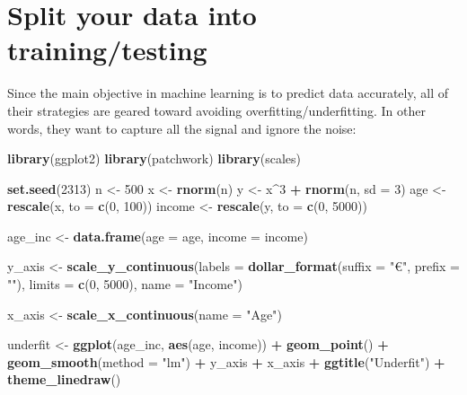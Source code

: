\documentclass[
]{book}
\newenvironment{Shaded}{\begin{snugshade}}{\end{snugshade}}
\newcommand{\DataTypeTok}[1]{\textcolor[rgb]{0.13,0.29,0.53}{#1}}
\newcommand{\DecValTok}[1]{\textcolor[rgb]{0.00,0.00,0.81}{#1}}
\newcommand{\KeywordTok}[1]{\textcolor[rgb]{0.13,0.29,0.53}{\textbf{#1}}}
\newcommand{\NormalTok}[1]{#1}
\newcommand{\OperatorTok}[1]{\textcolor[rgb]{0.81,0.36,0.00}{\textbf{#1}}}
\newcommand{\StringTok}[1]{\textcolor[rgb]{0.31,0.60,0.02}{#1}}
\begin{document}
\hypertarget{split-your-data-into-trainingtesting}{%
\section{Split your data into training/testing}\label{split-your-data-into-trainingtesting}}

Since the main objective in machine learning is to predict data accurately, all of their strategies are geared toward avoiding overfitting/underfitting. In other words, they want to capture all the signal and ignore the noise:

\begin{Shaded}
\begin{Highlighting}[]
\KeywordTok{library}\NormalTok{(ggplot2)}
\KeywordTok{library}\NormalTok{(patchwork)}
\KeywordTok{library}\NormalTok{(scales)}

\KeywordTok{set.seed}\NormalTok{(}\DecValTok{2313}\NormalTok{)}
\NormalTok{n <-}\StringTok{ }\DecValTok{500}
\NormalTok{x <-}\StringTok{ }\KeywordTok{rnorm}\NormalTok{(n)}
\NormalTok{y <-}\StringTok{ }\NormalTok{x}\OperatorTok{^}\DecValTok{3} \OperatorTok{+}\StringTok{ }\KeywordTok{rnorm}\NormalTok{(n, }\DataTypeTok{sd =} \DecValTok{3}\NormalTok{)}
\NormalTok{age <-}\StringTok{ }\KeywordTok{rescale}\NormalTok{(x, }\DataTypeTok{to =} \KeywordTok{c}\NormalTok{(}\DecValTok{0}\NormalTok{, }\DecValTok{100}\NormalTok{))}
\NormalTok{income <-}\StringTok{ }\KeywordTok{rescale}\NormalTok{(y, }\DataTypeTok{to =} \KeywordTok{c}\NormalTok{(}\DecValTok{0}\NormalTok{, }\DecValTok{5000}\NormalTok{))}

\NormalTok{age_inc <-}\StringTok{ }\KeywordTok{data.frame}\NormalTok{(}\DataTypeTok{age =}\NormalTok{ age, }\DataTypeTok{income =}\NormalTok{ income)}

\NormalTok{y_axis <-}\StringTok{ }\KeywordTok{scale_y_continuous}\NormalTok{(}\DataTypeTok{labels =} \KeywordTok{dollar_format}\NormalTok{(}\DataTypeTok{suffix =} \StringTok{"€"}\NormalTok{, }\DataTypeTok{prefix =} \StringTok{""}\NormalTok{),}
                             \DataTypeTok{limits =} \KeywordTok{c}\NormalTok{(}\DecValTok{0}\NormalTok{, }\DecValTok{5000}\NormalTok{),}
                             \DataTypeTok{name =} \StringTok{"Income"}\NormalTok{)}

\NormalTok{x_axis <-}\StringTok{ }\KeywordTok{scale_x_continuous}\NormalTok{(}\DataTypeTok{name =} \StringTok{"Age"}\NormalTok{)}

\NormalTok{underfit <-}
\StringTok{  }\KeywordTok{ggplot}\NormalTok{(age_inc, }\KeywordTok{aes}\NormalTok{(age, income)) }\OperatorTok{+}
\StringTok{  }\KeywordTok{geom_point}\NormalTok{() }\OperatorTok{+}
\StringTok{  }\KeywordTok{geom_smooth}\NormalTok{(}\DataTypeTok{method =} \StringTok{"lm"}\NormalTok{) }\OperatorTok{+}
\StringTok{  }\NormalTok{y_axis }\OperatorTok{+}
\StringTok{  }\NormalTok{x_axis }\OperatorTok{+}\StringTok{  }
\StringTok{  }\KeywordTok{ggtitle}\NormalTok{(}\StringTok{"Underfit"}\NormalTok{) }\OperatorTok{+}
\StringTok{  }\KeywordTok{theme_linedraw}\NormalTok{()}


\end{Highlighting}
\end{Shaded}
\end{document}
